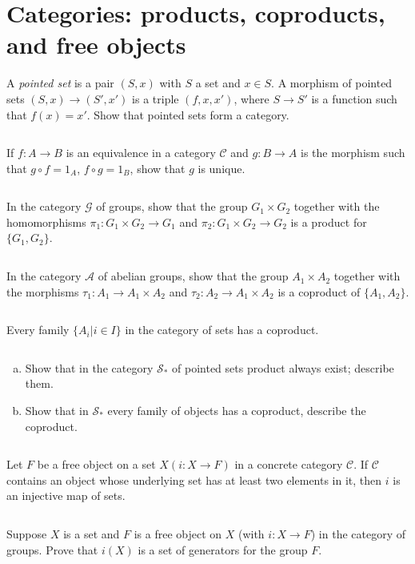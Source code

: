 \section{Categories: products, coproducts, and free objects}
\begin{ex}
    A \emph{pointed set} is a pair $(S,x)$ with $S$ a set and $x\in S$. A morphism of pointed sets $(S,x)\to (S', x')$ is a triple $(f,x,x')$, where $S\to S'$ is a function such that $f(x)=x'$. Show that pointed sets form a category.
\end{ex}

$$ $$

\begin{ex}
    If $f:A\to B$ is an equivalence in a category $\mathcal{C}$ and $g:B\to A$ is the morphism such that $g\circ f=1_{A}$, $f\circ g=1_{B}$, show that $g$ is unique.
\end{ex}

$$ $$

\begin{ex}
    In the category $\mathcal{G}$ of groups, show that the group $G_{1}\times G_{2}$ together with the homomorphisms $\pi_{1}:G_{1}\times G_{2}\to G_{1}$ and $\pi_{2}:G_{1}\times G_{2}\to G_{2}$ is a product for $\{G_{1},G_{2}\}$.
\end{ex}

$$ $$

\begin{ex}
    In the category $\mathcal{A}$ of abelian groups, show that the group $A_{1}\times A_{2}$ together with the morphisms $\tau_{1}:A_{1}\to A_{1}\times A_{2}$ and $\tau_{2}:A_{2}\to A_{1}\times A_{2}$ is a coproduct of $\{A_{1}, A_{2}\}$.
\end{ex}

$$ $$

\begin{ex}
    Every family $\{A_{i}|i\in I\}$ in the category of sets has a coproduct.
\end{ex}

$$ $$

\begin{ex}
    \begin{enumerate}[(a)]
        \item Show that in the category $\mathcal{S}_{*}$ of pointed sets product always exist; describe them.
        \item Show that in $\mathcal{S}_{*}$ every family of objects has a coproduct, describe the coproduct.
    \end{enumerate}
\end{ex}

$$ $$

\begin{ex}
    Let $F$ be a free object on a set $X(i:X\to F)$ in a concrete category $\mathcal{C}$. If $\mathcal{C}$ contains an object whose underlying set has at least two elements in it, then $i$ is an injective map of sets.
\end{ex}

$$ $$

\begin{ex}
    Suppose $X$ is a set and $F$ is a free object on $X$ (with $i:X\to F$) in the category of groups. Prove that $i(X)$ is a set of generators for the group $F$.
\end{ex}
